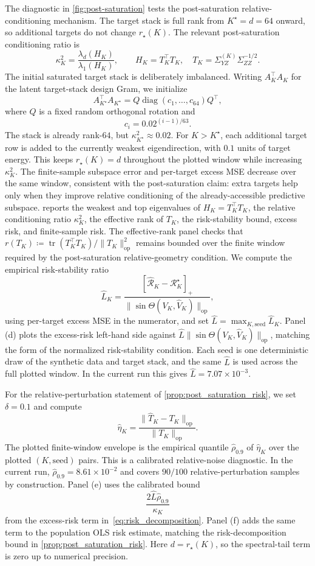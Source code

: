 The diagnostic in \cref{fig:post-saturation} tests the post-saturation
relative-conditioning mechanism. The target stack is full rank from
$K^\star=d=64$ onward, so
additional targets do not change $r_\star(K)$. The relevant post-saturation
conditioning ratio is
\[
    \kappa_K^2
    =
    \frac{\lambda_d(H_K)}{\lambda_1(H_K)},
    \qquad
    H_K=T_K^\top T_K,\quad
    T_K=\Sigma_{YZ}^{(K)}\Sigma_{ZZ}^{-1/2}.
\]
The initial saturated target stack is deliberately imbalanced. Writing
$A_K^\top A_K$ for the latent target-stack design Gram, we initialize
\[
    A_{K^\star}^\top A_{K^\star}
    =
    Q\operatorname{diag}(c_1,\ldots,c_{64})Q^\top,
\]
where $Q$ is a fixed random orthogonal rotation and
\[
    c_i
    =
    0.02^{(i-1)/63}.
\]
The stack is already rank-$64$, but
$\kappa_{K^\star}^2\approx 0.02$. For $K>K^\star$, each additional target row
is added to the currently weakest eigendirection, with $0.1$ units of target
energy. This keeps $r_\star(K)=d$ throughout the plotted window while increasing
$\kappa_K^2$. The finite-sample subspace error and per-target excess MSE
decrease over the same window, consistent with the post-saturation claim: extra
targets help only when they improve relative conditioning of the
already-accessible predictive subspace.
 reports the weakest and top eigenvalues of
$H_K=T_K^\top T_K$, the relative conditioning ratio $\kappa_K^2$, the effective
rank of $T_K$, the risk-stability bound, excess risk, and finite-sample
risk. The effective-rank panel checks that
$r(T_K)\coloneqq\operatorname{tr}(T_K^\top T_K)/\|T_K\|_{\mathrm{op}}^2$ remains
bounded over the finite window required by
the post-saturation relative-geometry condition. We compute the empirical
risk-stability ratio
\[
    \widehat L_K
    =
    \frac{[\widehat{\mathcal R}_K-\mathcal R_K^\star]_+}
    {\|\sin\Theta(V_K,\widehat V_K)\|_{\mathrm{op}}},
\]
using per-target excess MSE in the numerator, and set
$\widehat L=\max_{K,\mathrm{seed}}\widehat L_K$. Panel (d) plots the
excess-risk left-hand side against
$\widehat L\|\sin\Theta(V_K,\widehat V_K)\|_{\mathrm{op}}$, matching the form of
the normalized risk-stability condition. Each seed is one
deterministic draw of the synthetic data and target stack, and the same
$\widehat L$ is used across the full plotted window. In the current run this
gives $\widehat L=7.07\times10^{-3}$.

{\color{blue}For the relative-perturbation statement of
\cref{prop:post_saturation_risk}, we set $\delta=0.1$ and compute
\[
    \widehat{\eta}_K
    =
    \frac{\|\widehat T_K-T_K\|_{\mathrm{op}}}{\|T_K\|_{\mathrm{op}}}.
\]
The plotted finite-window envelope is the empirical quantile
$\widehat\rho_{0.9}$ of $\widehat{\eta}_K$ over the plotted
$(K,\mathrm{seed})$ pairs. This is a calibrated relative-noise diagnostic. In
the current run, $\widehat\rho_{0.9}=8.61\times10^{-2}$ and covers $90/100$
relative-perturbation samples by construction. Panel (e) uses the calibrated
bound
\[
    \frac{2\widehat L\widehat\rho_{0.9}}{\kappa_K}
\]
from the excess-risk term in~\eqref{eq:risk_decomposition}. Panel (f) adds the
same term to the population OLS risk estimate, matching the risk-decomposition
bound in \cref{prop:post_saturation_risk}. Here $d=r_\star(K)$, so the
spectral-tail term is zero up to numerical precision.}

